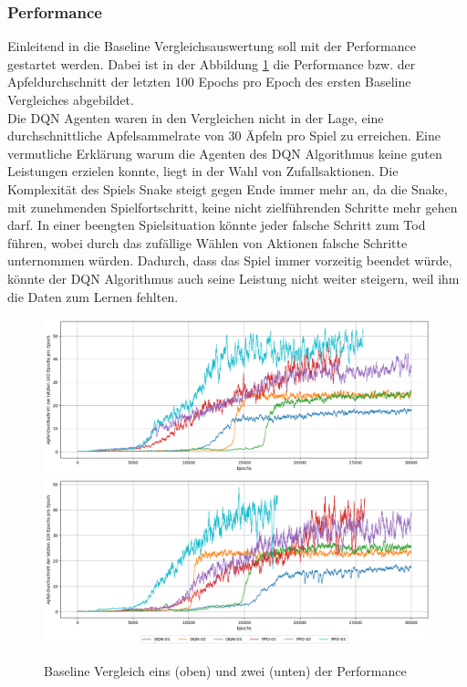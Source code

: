 \subsubsection{Performance}
Einleitend in die Baseline Vergleichsauswertung soll mit der Performance gestartet werden. Dabei ist in der Abbildung \ref{fig:Baseline_01_performance} die Performance bzw. der Apfeldurchschnitt der letzten 100 Epochs pro Epoch des ersten Baseline Vergleiches abgebildet.\\
Die DQN Agenten waren in den Vergleichen nicht in der Lage, eine durchschnittliche Apfelsammelrate von 30 Äpfeln pro Spiel zu erreichen. 
Eine vermutliche Erklärung warum die Agenten des DQN Algorithmus keine guten Leistungen erzielen konnte, liegt in der Wahl von Zufallsaktionen. Die Komplexität des Spiels Snake steigt gegen Ende immer mehr an, da die Snake, mit zunehmenden Spielfortschritt, keine nicht zielführenden Schritte mehr gehen darf. In einer beengten Spielsituation könnte jeder falsche Schritt zum Tod führen, wobei durch das zufällige Wählen von Aktionen falsche Schritte unternommen würden. Dadurch, dass das Spiel immer vorzeitig beendet würde, könnte der DQN Algorithmus auch seine Leistung nicht weiter steigern, weil ihm die Daten zum Lernen fehlten.
\begin{figure}[H]
	\centering
	\includegraphics[scale=0.4517]{Abbildungen/Evaluation/performance-rate_baseline_01.png}
	\includegraphics[scale=0.4515]{Abbildungen/Evaluation/performance-rate_baseline_02.png}
	\caption[Baseline Vergleich Performance]{Baseline Vergleich eins (oben) und zwei (unten) der Performance}
	\label{fig:Baseline_01_performance}
\end{figure}
